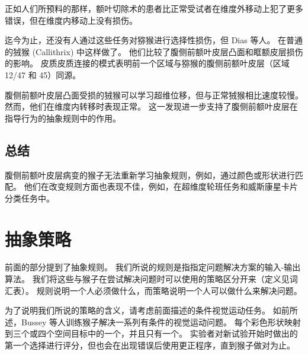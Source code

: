 正如人们所预料的那样，额叶切除术的患者比正常受试者在维度外移动上犯了更多错误，但在维度内移动上没有损伤\cite{owen1993contrasting}。
\par


迄今为止，还没有人通过这些任务对猕猴进行选择性损伤，但 Dias 等人。
\cite{dias1997dissociable}在普通的狨猴 (Callithrix) 中这样做了。 
他们比较了腹侧前额叶皮层凸面和眶额皮层损伤的影响。 
皮质皮质连接的模式表明前一个区域与猕猴的腹侧前额叶皮层（区域 12/47 和 45）同源\cite{roberts2007forebrain}。
\par


腹侧前额叶皮层凸面受损的狨猴可以学习超维位移，但与正常狨猴相比速度较慢\cite{dias1997dissociable}。
然而，他们在维度内转移时表现正常。 
这一发现进一步支持了腹侧前额叶皮层在指导行为的抽象规则中的作用。



\subsection{总结}
\par

腹侧前额叶皮层病变的猴子无法重新学习抽象规则，例如，通过颜色或形状进行匹配。
他们在改变规则方面也表现不佳，例如，在超维度轮班任务和威斯康星卡片分类任务中。



\section{抽象策略}
\par 
前面的部分提到了抽象规则。
我们所说的规则是指指定问题解决方案的输入-输出算法。
我们将这些与猴子在尝试解决问题时可以使用的策略区分开来（定义见词汇表）。
规则说明一个人必须做什么，而策略说明一个人可以做什么来解决问题。
\par 


为了说明我们所说的策略的含义，请考虑前面描述的条件视觉运动任务。 
如前所述，Bussey 等人\cite{bussey2001role}训练猴子解决一系列有条件的视觉运动问题。
每个彩色形状映射到三个或四个空间目标中的一个，并且只有一个。
实验者对新试验开始时做出的第一个选择进行评分，但也会在出现错误后使用更正程序，直到猴子做对为止。


